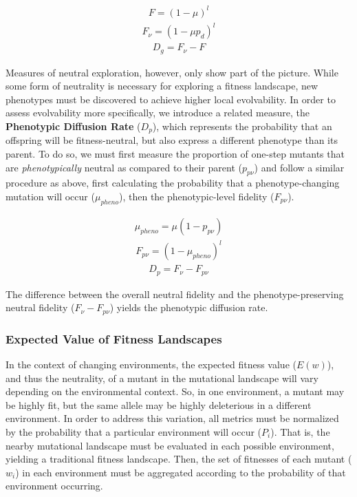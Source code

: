 \documentclass[10pt,letterpaper]{article}
\begin{document}
	\begin{eqnarray}
	\label{eq:fidelity}
		F = (1 - \mu)^l
	\end{eqnarray}
	\begin{eqnarray}
	\label{eq:neutral_fidelity}
		F_\nu = (1 - \mu p_d)^l
	\end{eqnarray}
	\begin{eqnarray}
	\label{eq:genomic_diffusion_rate}
		D_g = F_\nu - F
	\end{eqnarray}

Measures of neutral exploration, however, only show part of the picture. While some form of neutrality is necessary for exploring a fitness landscape, new phenotypes must be discovered to achieve higher local evolvability. In order to assess evolvability more specifically, we introduce a related measure, the \textbf{Phenotypic Diffusion Rate} ($D_p$), which represents the probability that an offspring will be fitness-neutral, but also express a different phenotype than its parent. To do so, we must first measure the proportion of one-step mutants that are \textit{phenotypically} neutral as compared to their parent ($p_{p\nu}$) and follow a similar procedure as above, first calculating the probability that a phenotype-changing mutation will occur ($\mu_{pheno}$), then the phenotypic-level fidelity ($F_{p\nu}$).

	\begin{eqnarray}
	\label{eq:phenotypic_mutation_rate}
		\mu_{pheno} = \mu (1- p_{p\nu})
	\end{eqnarray}
	\begin{eqnarray}
	\label{eq:phenotypic_fidelity}
		F_{p\nu} = (1 - \mu_{pheno})^l
	\end{eqnarray}
	\begin{eqnarray}
	\label{eq:phenotypic_diffusion_rate}
		D_p = F_\nu - F_{p\nu}
	\end{eqnarray}

The difference between the overall neutral fidelity and the phenotype-preserving neutral fidelity ($F_\nu - F_{p\nu}$) yields the phenotypic diffusion rate.

\subsubsection*{Expected Value of Fitness Landscapes}
In the context of changing environments, the expected fitness value ($E(w)$), and thus the neutrality, of a mutant in the mutational landscape will vary depending on the environmental context. So, in one environment, a mutant may be highly fit, but the same allele may be highly deleterious in a different environment. In order to address this variation, all metrics must be normalized by the probability that a particular environment will occur ($P_i$). That is, the nearby mutational landscape must be evaluated in each possible environment, yielding a traditional fitness landscape. Then, the set of fitnesses of each mutant ($w_i$) in each environment must be aggregated according to the probability of that environment occurring.
\end{document}
